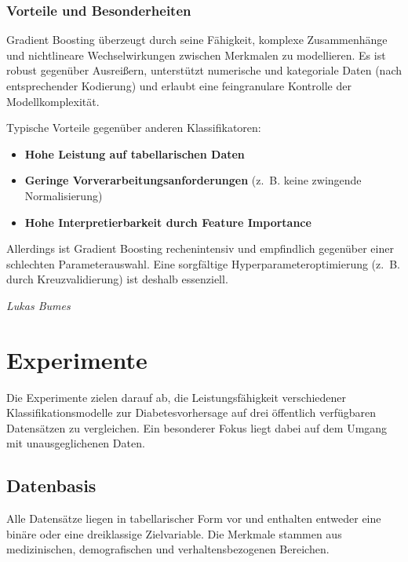 \documentclass[10pt]{scrartcl}
\begin{document}
\subsubsection{Vorteile und Besonderheiten}

Gradient Boosting überzeugt durch seine Fähigkeit, komplexe Zusammenhänge und nichtlineare Wechselwirkungen zwischen Merkmalen zu modellieren. Es ist robust gegenüber Ausreißern, unterstützt numerische und kategoriale Daten (nach entsprechender Kodierung) und erlaubt eine feingranulare Kontrolle der Modellkomplexität.

Typische Vorteile gegenüber anderen Klassifikatoren:

\begin{itemize}
    \item \textbf{Hohe Leistung auf tabellarischen Daten}
    \item \textbf{Geringe Vorverarbeitungsanforderungen} (z.~B. keine zwingende Normalisierung)
    \item \textbf{Hohe Interpretierbarkeit durch Feature Importance}
\end{itemize}

Allerdings ist Gradient Boosting rechenintensiv und empfindlich gegenüber einer schlechten Parameterauswahl. Eine sorgfältige Hyperparameteroptimierung (z.~B. durch Kreuzvalidierung) ist deshalb essenziell.

\begin{flushright}
  \footnotesize\textit{Lukas Bumes}
\end{flushright}






\section{Experimente}
\label{sec:experiments}
Die Experimente zielen darauf ab, die Leistungsfähigkeit verschiedener Klassifikationsmodelle zur Diabetesvorhersage auf drei öffentlich verfügbaren Datensätzen zu vergleichen. Ein besonderer Fokus liegt dabei auf dem Umgang mit unausgeglichenen Daten.

\subsection{Datenbasis}
Alle Datensätze liegen in tabellarischer Form vor und enthalten entweder eine binäre oder eine dreiklassige Zielvariable. Die Merkmale stammen aus medizinischen, demografischen und verhaltensbezogenen Bereichen.
\end{document}
